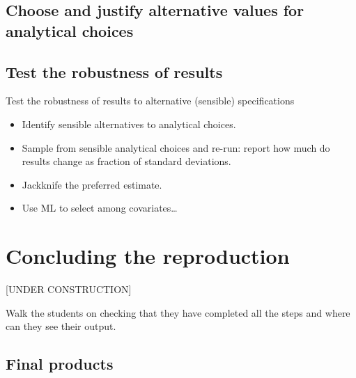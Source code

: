 \documentclass[]{book}
\providecommand{\tightlist}{%
  \setlength{\itemsep}{0pt}\setlength{\parskip}{0pt}}
\begin{document}
\hypertarget{test-rob}{%
\section{Choose and justify alternative values for analytical choices}\label{test-rob}}

\hypertarget{test-the-robustness-of-results}{%
\section{Test the robustness of results}\label{test-the-robustness-of-results}}

Test the robustness of results to alternative (sensible) specifications

\begin{itemize}
\tightlist
\item
  Identify sensible alternatives to analytical choices.
\item
  Sample from sensible analytical choices and re-run: report how much do results change as fraction of standard deviations.\\
\item
  Jackknife the preferred estimate.
\item
  Use ML to select among covariates\ldots{}
\end{itemize}

\hypertarget{concluding-the-reproduction}{%
\chapter{Concluding the reproduction}\label{concluding-the-reproduction}}

{[}UNDER CONSTRUCTION{]}

Walk the students on checking that they have completed all the steps and where can they see their output.

\hypertarget{final-products}{%
\section{Final products}\label{final-products}}
\end{document}
